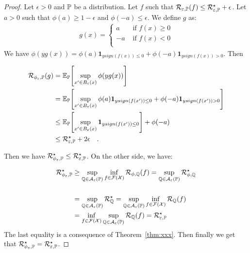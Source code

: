     \begin{proof}
    Let $\epsilon>0$ and $\mathbb{P}$ be a distribution. Let $f$ such that $\mathcal{R}_{\varepsilon,\mathbb{P}}(f) \leq \mathcal{R}_{\varepsilon,\mathbb{P}}^\star +\epsilon$. Let $a>0$ such that $\phi(a)\geq 1-\epsilon$ and $\phi(-a)\leq\epsilon$. We define $g$ as: 
    \begin{align*}
         g(x)= \left\{
        \begin{array}{ll}
        a&\text{ if } f(x)\geq 0\\
        -a&\text{ if } f(x)< 0\\
      \end{array}
      \right.
    \end{align*}
    We have $\phi(yg(x)) = \phi(a) \mathbf{1}_{y sign(f(x))\leq 0}+  \phi(-a) \mathbf{1}_{y sign(f(x))>0}$. Then
    
    \begin{align*}
      \risk_{\phi_\varepsilon,\PP}(g) & = \EE_\PP\left[\sup_{x'\in B_\varepsilon(x)}\phi(yg(x))\right]\\
      & = \EE_\PP\left[\sup_{x'\in B_\varepsilon(x)}\phi(a) \mathbf{1}_{y sign(f(x'))\leq 0}+  \phi(-a) \mathbf{1}_{y sign(f(x'))>0}\right]\\
      &\leq  \EE_\PP\left[\sup_{x'\in B_\varepsilon(x)}\mathbf{1}_{y sign(f(x'))\leq 0}\right]+\phi(-a)\\
      &\leq \risk_{\varepsilon,\PP}^\star + 2\epsilon\quad.
    \end{align*}
    
    Then we have $\mathcal{R}_{\phi_\varepsilon,\mathbb{P}}^\star\leq \mathcal{R}_{\varepsilon,\mathbb{P}}^\star$.
    On the other side, we have: 
    
    \begin{align*}
     \mathcal{R}_{\phi_\varepsilon,\mathbb{P}}^\star & \geq \sup_{\mathbb{Q}\in\mathcal{A}_\varepsilon(\mathbb{P})}  \inf_{f\in\mathcal{F}(\mathcal{X})} \mathcal{R}_{\phi,\mathbb{Q}}(f) = \sup_{\mathbb{Q}\in\mathcal{A}_\varepsilon(\mathbb{P})}  \mathcal{R}_{\phi,\mathbb{Q}}^\star\\
      \\ &= \sup_{\mathbb{Q}\in\mathcal{A}_\varepsilon(\mathbb{P})}  \mathcal{R}_{\mathbb{Q}}^\star= \sup_{\mathbb{Q}\in\mathcal{A}_\varepsilon(\mathbb{P})}\inf_{f\in\mathcal{F}(\mathcal{X})} \mathcal{R}_{\mathbb{Q}}(f)  \\
      & =  \inf_{f\in\mathcal{F}(\mathcal{X})} \sup_{\mathbb{Q}\in\mathcal{A}_\varepsilon(\mathbb{P})}\mathcal{R}_{\mathbb{Q}}(f) = \mathcal{R}_{\varepsilon,\mathbb{P}}^\star \\
    \end{align*}
    The last equality is a consequence of Theorem~\ref{thm:xxx}. Then finally we get that $\mathcal{R}_{\phi_\varepsilon,\mathbb{P}}^\star=  \mathcal{R}_{\varepsilon,\mathbb{P}}^\star$.
    
    \end{proof}



